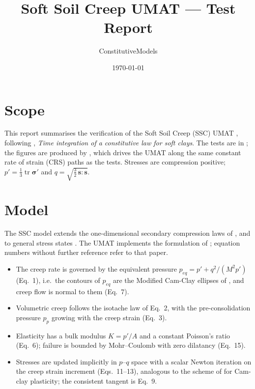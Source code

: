\documentclass[11pt,a4paper]{article}
\title{Soft Soil Creep UMAT --- Test Report}
\author{ConstitutiveModels}
\date{\today}
\begin{document}
\maketitle

\section{Scope}
This report summarises the verification of the Soft Soil Creep (SSC) UMAT
, following \citet{Stolle_1999},
\emph{Time integration of a constitutive law for soft clays}. The tests are in
; the figures are produced by
, which drives the UMAT along the same
constant rate of strain (CRS) paths as the tests.
Stresses are compression positive; $p' = \tfrac13 \operatorname{tr}\boldsymbol\sigma'$ and
$q = \sqrt{\tfrac32\,\mathbf s:\mathbf s}$.

\section{Model}
The SSC model extends the one-dimensional secondary compression laws of \citet{Buisman_1936},
\citet{Bjerrum_1967} and \citet{Garlanger_1972} to general stress states
\citep{Stolle_1997, Vermeer_1998, Vermeer_1999}. The UMAT implements the formulation of
\citet{Stolle_1999}; equation numbers without further reference refer to that paper.
\begin{itemize}
  \item The creep rate is governed by the equivalent pressure $p_{eq} = p' + q^2/(M^2 p')$
        (Eq.~1), i.e.\ the contours of $p_{eq}$ are the Modified Cam-Clay ellipses of
        \citet{Roscoe_1968}, and creep flow is normal to them (Eq.~7).
  \item Volumetric creep follows the isotache law of Eq.~2, with the pre-consolidation pressure
        $p_p$ growing with the creep strain (Eq.~3).
  \item Elasticity has a bulk modulus $K = p'/A$ and a constant Poisson's ratio (Eq.~6); failure is
        bounded by Mohr--Coulomb with zero dilatancy (Eq.~15).
  \item Stresses are updated implicitly in $p$--$q$ space with a scalar Newton iteration on the creep
        strain increment (Eqs.~11--13), analogous to the scheme of \citet{Borja_1990} for Cam-clay
        plasticity; the consistent tangent is Eq.~9.
\end{itemize}
\end{document}
